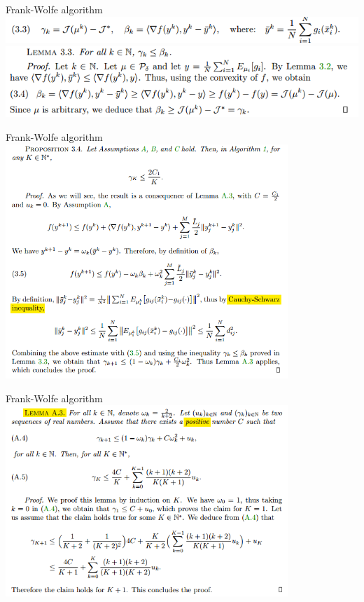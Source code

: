 \documentclass{beamer}
\begin{document}
\begin{frame}{Frank-Wolfe algorithm}
	\includegraphics[width=\textwidth]{kde/9.png}\\
	\includegraphics[width=\textwidth]{kde/10.png}
\end{frame}



\begin{frame}{Frank-Wolfe algorithm}
	\includegraphics[width=0.8\textwidth]{kde/11.png}
\end{frame}

\begin{frame}{Frank-Wolfe algorithm}
	\includegraphics[width=0.8\textwidth]{kde/19.png}
\end{frame}
\end{document}
